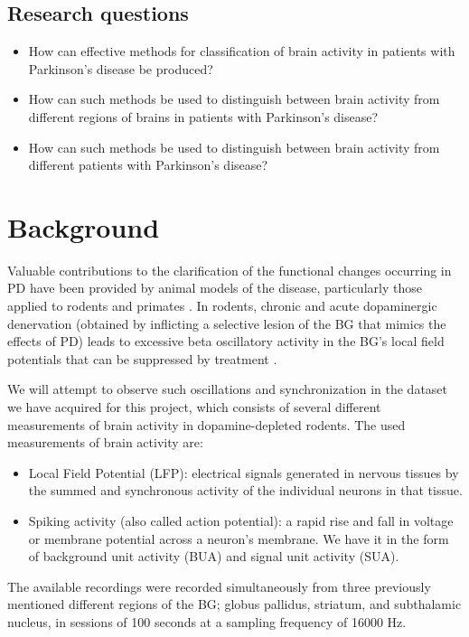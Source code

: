 \documentclass{kththesis}
\begin{document}
\section{Research questions}

\begin{itemize}
    \item How can effective methods for classification of brain activity in patients with Parkinson's disease be produced?
    \item How can such methods be used to distinguish between brain activity from different regions of brains in patients with Parkinson's disease?
    \item How can such methods be used to distinguish between brain activity from different patients with Parkinson's disease?
\end{itemize}

\newpage
\chapter{Background}

Valuable contributions to the clarification of the functional changes occurring in PD have been provided by animal models of the disease, particularly those applied to rodents and primates \parencite{Mallet}. 
In rodents, chronic and acute dopaminergic denervation (obtained by inflicting a selective lesion of the BG that mimics the effects of PD) leads to excessive beta oscillatory activity in the BG's local field potentials that can be suppressed by treatment \parencite{Mallet}.

We will attempt to observe such oscillations and synchronization in the dataset we have acquired for this project, which consists of several different measurements of brain activity in dopamine-depleted rodents. 
The used measurements of brain activity are:

\begin{itemize}
    \item Local Field Potential (LFP): electrical signals generated in nervous tissues by the summed and synchronous activity of the individual neurons in that tissue.
    \item Spiking activity (also called action potential): a rapid rise and fall in voltage or membrane potential across a neuron's membrane. We have it in the form of background unit activity (BUA) and signal unit activity (SUA).
\end{itemize}

The available recordings were recorded simultaneously from three previously mentioned different regions of the BG; globus pallidus, striatum, and subthalamic nucleus, in sessions of 100 seconds at a sampling frequency of 16000 Hz.
\end{document}
